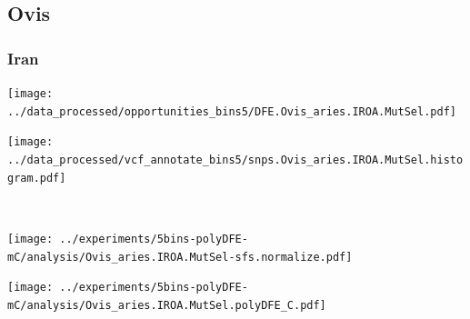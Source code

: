 \subsection{Ovis}

\subsubsection{Iran}

\begin{minipage}{0.49\linewidth}
    \texttt{[image: ../data\_processed/opportunities\_bins5/DFE.Ovis\_aries.IROA.MutSel.pdf]}
\end{minipage}
\begin{minipage}{0.49\linewidth}
    \texttt{[image: ../data\_processed/vcf\_annotate\_bins5/snps.Ovis\_aries.IROA.MutSel.histogram.pdf]}
\end{minipage}
\\
\begin{minipage}{0.49\linewidth}
    \texttt{[image: ../experiments/5bins-polyDFE-mC/analysis/Ovis\_aries.IROA.MutSel-sfs.normalize.pdf]}
\end{minipage}
\begin{minipage}{0.4\linewidth}
    \texttt{[image: ../experiments/5bins-polyDFE-mC/analysis/Ovis\_aries.IROA.MutSel.polyDFE\_C.pdf]}
\end{minipage}
